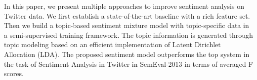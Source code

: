 In this paper, we present multiple approaches to improve sentiment analysis on Twitter data. We first establish a state-of-the-art baseline with a rich feature set. Then we build a topic-based sentiment mixture model with topic-specific data in a semi-supervised training framework. The topic information is generated through topic modeling based on an efficient implementation of Latent Dirichlet Allocation (LDA). The proposed sentiment model outperforms the top system in the task of Sentiment Analysis in Twitter in SemEval-2013 in terms of averaged F scores.
